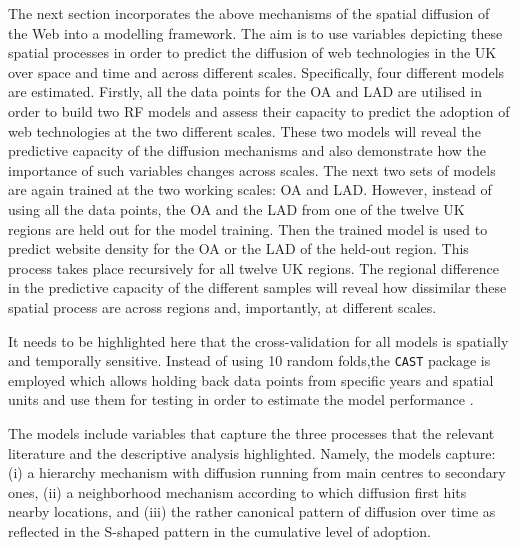 \documentclass[
  authoryear,
  preprint,
  3p]{elsarticle}
\begin{document}
The next section incorporates the above mechanisms of the spatial
diffusion of the Web into a modelling framework. The aim is to use
variables depicting these spatial processes in order to predict the
diffusion of web technologies in the UK over space and time and across
different scales. Specifically, four different models are estimated.
Firstly, all the data points for the OA and LAD are utilised in order to
build two RF models and assess their capacity to predict the adoption of
web technologies at the two different scales. These two models will
reveal the predictive capacity of the diffusion mechanisms and also
demonstrate how the importance of such variables changes across scales.
The next two sets of models are again trained at the two working scales:
OA and LAD. However, instead of using all the data points, the OA and
the LAD from one of the twelve UK regions are held out for the model
training. Then the trained model is used to predict website density for
the OA or the LAD of the held-out region. This process takes place
recursively for all twelve UK regions. The regional difference in the
predictive capacity of the different samples will reveal how dissimilar
these spatial process are across regions and, importantly, at different
scales.

It needs to be highlighted here that the cross-validation for all models
is spatially and temporally sensitive. Instead of using 10 random
folds,the \texttt{CAST} package is employed which allows holding back
data points from specific years and spatial units and use them for
testing in order to estimate the model performance
\citep{meyer2018improving}.

The models include variables that capture the three processes that the
relevant literature and the descriptive analysis highlighted. Namely,
the models capture: (i) a hierarchy mechanism with diffusion running
from main centres to secondary ones, (ii) a neighborhood mechanism
according to which diffusion first hits nearby locations, and (iii) the
rather canonical pattern of diffusion over time as reflected in the
S-shaped pattern in the cumulative level of adoption.
\end{document}
